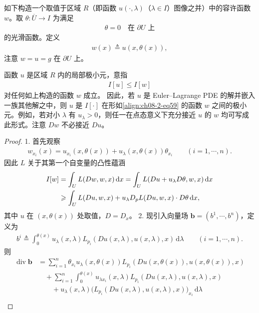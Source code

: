 \documentclass[../../main.tex]{subfiles}
\begin{document}
如下构造一个取值于区域 $R$（即函数 $u(\cdot,\lambda)$（$\lambda\in I$）图像之并）中的容许函数 $w$。取 $\theta:\overline{U}\to I$ 为满足
\begin{align}
\theta=0\quad\text{在 }\partial U\text{ 上}\label{align:ch08-2-eq58}
\end{align}
的光滑函数。定义
\begin{align}
w(x)\triangleq u(x,\theta(x)),\label{align:ch08-2-eq59}
\end{align}
注意 $w=u=g$ 在 $\partial U$ 上。

\begin{theorem}[局部极小元]\label{theorem:ch08-2-10-局部极小元}
函数 $u$ 是区域 $R$ 内的局部极小元，意指
\begin{align}
I[u]\leqslant I[w]\label{align:ch08-2-eq60}
\end{align}
对任何如上构造的函数 $w$ 成立。
因此，若 $u$ 是 Euler--Lagrange PDE 的解并嵌入一族其他解之中，则 $u$ 是 $I[\cdot]$ 在形如\eqref{align:ch08-2-eq59} 的函数 $w$ 之间的极小元。例如，若对小 $\lambda$ 有 $u_\lambda>0$，则任一在点态意义下充分接近 $u$ 的 $w$ 均可写成此形式。注意 $Dw$ 不必接近 $Du$。
\begin{proof}
1. 首先观察
\begin{align*}
w_{x_i}(x)=u_{x_i}(x,\theta(x))+u_\lambda(x,\theta(x))\theta_{x_i}\qquad (i=1,\cdots,n).
\end{align*}
因此 $L$ 关于其第一个自变量的凸性蕴涵
\begin{align}
I[w]&=\int_U L(Dw,w,x)\,\mathrm{d}x=\int_U L(Du+u_\lambda D\theta,w,x)\,\mathrm{d}x\notag\\
&\geqslant\int_U L(Du,w,x)+u_\lambda D_pL(Du,w,x)\cdot D\theta\,\mathrm{d}x,\label{align:ch08-2-eq61}
\end{align}
其中 $u$ 在 $(x,\theta(x))$ 处取值，$D=D_x$。
2. 现引入向量场 $\mathbf{b}=(b^1,\cdots,b^n)$，定义为
\begin{align}
b^i\triangleq\int_0^{\theta(x)}u_\lambda(x,\lambda)L_{p_i}(Du(x,\lambda),u(x,\lambda),x)\,\mathrm{d}\lambda\qquad (i=1,\cdots,n).\label{align:ch08-2-eq62}
\end{align}
则
\begin{align*}
\operatorname{div}\mathbf{b}&=\sum_{i=1}^n\theta_{x_i}u_\lambda(x,\theta(x))L_{p_i}(Du(x,\theta(x)),u(x,\theta(x)),x)\\
&\quad+\sum_{i=1}^n\int_0^{\theta(x)}u_{\lambda x_i}(x,\lambda)L_{p_i}(Du(x,\lambda),u(x,\lambda),x)\\
&\qquad+u_\lambda(x,\lambda)\big(L_{p_i}(Du(x,\lambda),u(x,\lambda),x)\big)_{x_i}\,\mathrm{d}\lambda\\

\end{align*}
\end{proof}
\end{theorem}
\end{document}
